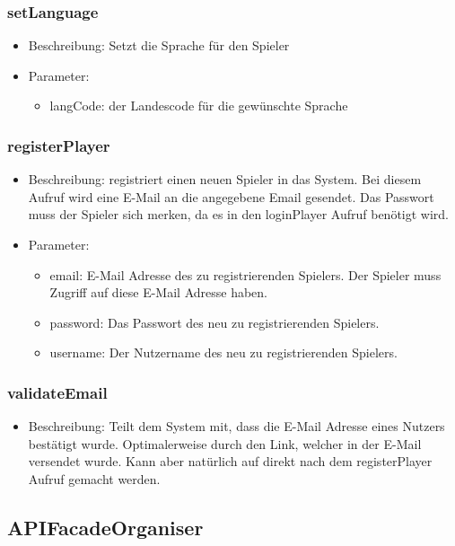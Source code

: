 \documentclass[a4paper]{scrreprt}
\begin{document}
	\subsubsection{setLanguage}
	\begin{itemize}
		\item Beschreibung: Setzt die Sprache für den Spieler
		\item Parameter:
		\begin{itemize}
			\item langCode: der Landescode für die gewünschte Sprache
		\end{itemize}
	\end{itemize}
    \subsubsection{registerPlayer}
    \begin{itemize}
        \item Beschreibung: registriert einen neuen Spieler in das System. Bei diesem Aufruf wird eine E-Mail an die angegebene Email gesendet. Das Passwort muss der Spieler sich merken, da es in den loginPlayer Aufruf benötigt wird.
        \item Parameter:
        \begin{itemize}
            \item email: E-Mail Adresse des zu registrierenden Spielers. Der Spieler muss Zugriff auf diese E-Mail Adresse haben.
            \item password: Das Passwort des neu zu registrierenden Spielers.
            \item username: Der Nutzername des neu zu registrierenden Spielers.
        \end{itemize}
    \end{itemize}
    \subsubsection{validateEmail}
    \begin{itemize}
        \item Beschreibung: Teilt dem System mit, dass die E-Mail Adresse eines Nutzers bestätigt wurde. Optimalerweise durch den Link, welcher in der E-Mail versendet wurde. Kann aber natürlich auf direkt nach dem registerPlayer Aufruf gemacht werden.
    \end{itemize}
	\subsection{APIFacadeOrganiser}
\end{document}
